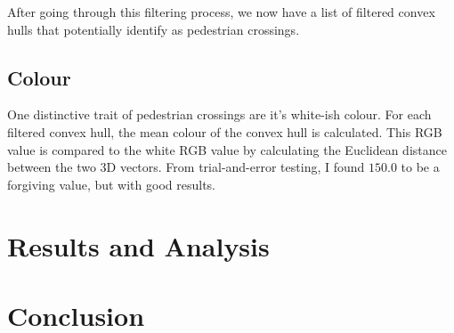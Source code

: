 \documentclass{article}  %
\begin{document}
	After going through this filtering process, we now have a list of filtered convex hulls that potentially identify as pedestrian crossings.
	
	\subsection{Colour}
	
	One distinctive trait of pedestrian crossings are it's white-ish colour. For each filtered convex hull, the mean colour of the convex hull is calculated. This RGB value is compared to the white RGB value by calculating the Euclidean distance between the two 3D vectors. From trial-and-error testing, I found $150.0$ to be a forgiving value, but with good results.
	
	\newpage
	\section{Results and Analysis}
	
	\section*{Conclusion}
\end{document}
